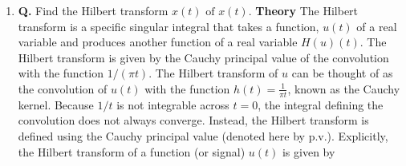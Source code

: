 \documentclass[main.tex]{subfiles}
\begin{document}
\begin{enumerate}
\begin{enumerate}
        Cosine Fourier transform:

        $$
        \begin{aligned}
        \mathcal{F}_t [\cos (2 \pi A t)](f) &= \int_{-\infty}^{\infty} \frac{e^{i 2 \pi A t}+e^{-i 2 \pi A t}}{2} e^{-i 2 \pi f t} d t \\
        & =\frac{1}{2}\left[\int_{-\infty}^{\infty} e^{i 2 \pi A t} e^{-i 2 \pi f t} d t+\int_{-\infty}^{\infty} e^{-i 2 \pi A t} e^{-i 2 \pi f t} d t\right] \\
        & =\frac{1}{2}[\delta(f-A)+\delta(f+A)]
        \end{aligned}
        $$
        
        \textbf{A.} Signal $x(t)$ is a converging signal because when $t = \infty$, $x(t) = \frac{1}{\infty} = 0 $ and is thus integrable.

        $$
        \begin{aligned}
        & \mathcal{F}_t\left[\frac{\sin (2 \pi B t) \cos (2 \pi f_c t)}{2 \pi B t}\right](f) \\ 
        &= \frac{1}{2 \pi B} \int_{-\infty}^{\infty} \frac{1}{t} \frac{e^{i 2 \pi B t}-e^{-i 2 \pi B t}}{2i} \frac{e^{i 2 \pi f_c t}+e^{-i 2 \pi f_c t}}{2} e^{-i 2 \pi f t} d t \\
        & = ... \\
        &= \frac{1}{4 \pi B} \left[ -\frac{1}{2} i\left(i \sqrt{\frac{\pi}{2}} \operatorname{sgn}(2 \pi B+\omega-2 f \pi)
        -i \sqrt{\frac{\pi}{2}} \operatorname{sgn}(-2 \pi B+\omega-2 f \pi)\right) \\
        &- \frac{1}{2} i\left( i \sqrt{\frac{\pi}{2}} \operatorname{sgn}(2 \pi B+\omega+2 f \pi)
        -i \sqrt{\frac{\pi}{2}} \operatorname{sgn}(-2 \pi B+\omega+2 f \pi) \right) \right]\\
        &= \frac{\operatorname{sgn}(B-f_c-f)+\operatorname{sgn}(B+f_c-f)+\operatorname{sgn}(B-f_c+f)+\operatorname{sgn}(B+f_c+f)}{8 B}
        \end{aligned}
        $$

        for $B \in \mathbb{R} \wedge f \in \mathbb{R}$.

        \item \textbf{Q.} Find the Hilbert transform $\hat{x}(t) \text { of } x(t)$. \textbf{Theory} The Hilbert transform is a specific singular integral that takes a function, $u(t)$ of a real variable and produces another function of a real variable $H(u)(t)$. The Hilbert transform is given by the Cauchy principal value of the convolution with the function $1 /(\pi t)$. The Hilbert transform of $u$ can be thought of as the convolution of $u(t)$ with the function $h(t)=\frac{1}{\pi t}$, known as the Cauchy kernel. Because $1 / t$ is not integrable across $t=0$, the integral defining the convolution does not always converge. Instead, the Hilbert transform is defined using the Cauchy principal value (denoted here by p.v.). Explicitly, the Hilbert transform of a function (or signal) $u(t)$ is given by
        

\end{enumerate}
\end{enumerate}
\end{document}
